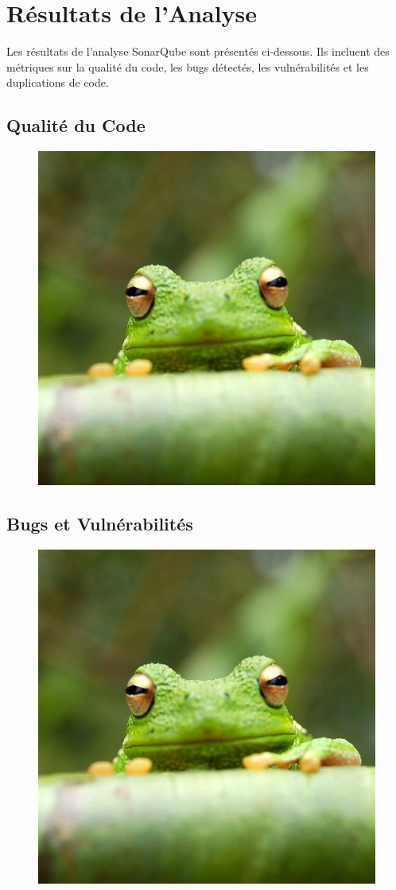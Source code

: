 \documentclass{article}
\begin{document}
\section{Résultats de l'Analyse}

Les résultats de l'analyse SonarQube sont présentés ci-dessous. Ils incluent des métriques sur la qualité du code, les bugs détectés, les vulnérabilités et les duplications de code.


\subsection{Qualité du Code}

\begin{figure}[H]
    \centering
    \includegraphics[width=0.5\linewidth]{assets/frog.jpg}
    \end{figure}

\subsection{Bugs et Vulnérabilités}

\begin{figure}[H]
    \centering
    \includegraphics[width=0.5\linewidth]{assets/frog.jpg}
    \end{figure}
\end{document}
